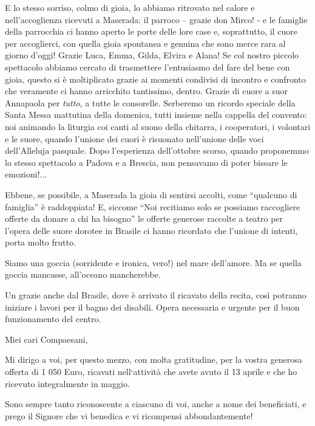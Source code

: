 E lo stesso sorriso, colmo di gioia, lo abbiamo ritrovato nel calore e nell’accoglienza ricevuti a Maserada: il parroco – grazie don Mirco! - e le famiglie della parrocchia ci hanno aperto le porte delle lore case e, soprattutto, il cuore per accoglierci, con quella gioia spontanea e genuina che sono merce rara al giorno d’oggi! Grazie Luca, Emma, Gilda, Elvira e Alana! Se col nostro piccolo spettacolo abbiamo cercato di trasmettere l’entusiasmo del fare del bene con gioia, questo si è moltiplicato grazie ai momenti condivisi di incontro e confronto che veramente ci hanno arricchito tantissimo, dentro.
Grazie di cuore a suor Annapaola per \textit{tutto}, a tutte le consorelle. Serberemo un ricordo speciale della Santa  Messa mattutina della domenica, tutti insieme nella cappella del convento: noi animando la liturgia coi canti al suono della chitarra, i cooperatori, i volontari e le suore, quando l’unione dei cuori è risuonato nell’unione delle voci dell’Alleluja pasquale. Dopo l’esperienza dell’ottobre scorso, quando proponemmo lo stesso spettacolo a Padova e a Brescia, non pensavamo di poter bissare le emozioni!...

Ebbene, se possibile, a Maserada la gioia di sentirsi accolti, come ``qualcuno di famiglia'' è raddoppiata! E, siccome ``Noi recitiamo solo se possiamo raccogliere offerte da donare a chi ha bisogno'' le offerte generose raccolte a teatro per l’opera delle suore dorotee in Brasile ci hanno ricordato che l’unione di intenti, porta molto frutto.


Siamo una goccia (sorridente e ironica, vero!) nel mare dell’amore. Ma se quella goccia mancasse, all’oceano mancherebbe.



Un grazie anche dal Brasile, dove è arrivato il ricavato della recita, così potranno iniziare i lavori per il bagno dei disabili. Opera necessaria e urgente per il buon funzionamento del centro.



Miei cari Compaesani,

Mi dirigo a voi, per questo mezzo,  con molta gratitudine, per la vostra generosa offerta di 1 050 Euro, ricavati nell`attività che avete avuto il 13 aprile e che ho ricevuto integralmente  in maggio.

Sono sempre tanto riconoscente a ciascuno di voi, anche a nome dei beneficiati, e prego il Signore che vi benedica e vi ricompensi abbondantemente!

